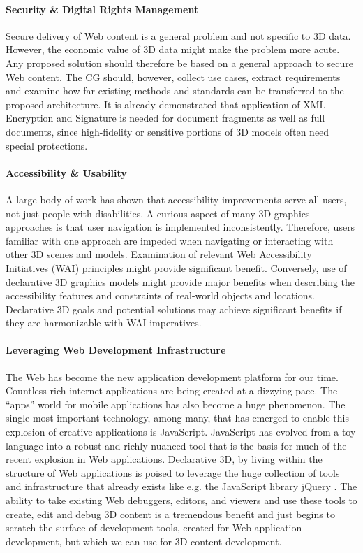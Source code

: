 \documentclass[review]{acmsiggraph}
\begin{document}
\paragraph{Security \& Digital Rights Management}
Secure delivery of Web content is a general problem and not specific to 3D data. However, the economic value of 3D data might make the problem more acute. Any proposed solution should therefore be based on a general approach to secure Web content. The CG should, however, collect use cases, extract requirements and examine how far existing methods and standards can be transferred to the proposed architecture. It is already demonstrated that application of XML Encryption and Signature is needed for document fragments as well as full documents, since high-fidelity or sensitive portions of 3D models often need special protections.

\paragraph{Accessibility \& Usability}
A large body of work has shown that accessibility improvements serve all users, not just people with disabilities.  A curious aspect of many 3D graphics approaches is that user navigation is implemented inconsistently.  Therefore, users familiar with one approach are impeded when navigating or interacting with other 3D scenes and models.  Examination of relevant Web Accessibility Initiatives (WAI) principles might provide significant benefit.  Conversely, use of declarative 3D graphics models might provide major benefits when describing the accessibility features and constraints of real-world objects and locations.  Declarative 3D goals and potential solutions may achieve significant benefits if they are harmonizable with WAI imperatives.

\paragraph{Leveraging Web Development Infrastructure}
The Web has become the new application development platform for our time. Countless rich internet applications are being created at a dizzying pace. The ``apps'' world for mobile applications has also become a huge phenomenon. The single most important technology, among many, that has emerged to enable this explosion of creative applications is JavaScript. JavaScript has evolved from a toy language into a robust and richly nuanced tool that is the basis for much of the recent explosion in Web applications.
Declarative 3D, by living within the structure of Web applications is poised to leverage the huge collection of tools and infrastructure that already exists like e.g. the JavaScript library jQuery \cite{jquery}. The ability to take existing Web debuggers, editors, and viewers and use these tools to create, edit and debug 3D content is a tremendous benefit and just begins to scratch the surface of development tools, created for Web application development, but which we can use for 3D content development.
\end{document}

